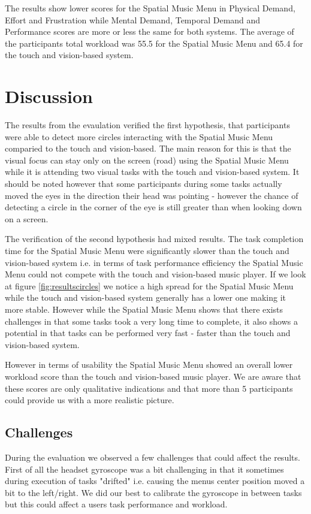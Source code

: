 The results show lower scores for the Spatial Music Menu in Physical Demand, Effort and Frustration while Mental Demand, Temporal Demand and Performance scores are more or less the same for both systems. The average of the participants total workload was 55.5 for the Spatial Music Menu and 65.4 for the touch and vision-based system.


\section{Discussion}
The results from the evaulation verified the first hypothesis, that participants were able to detect more circles interacting with the Spatial Music Menu comparied to the touch and vision-based. The main reason for this is that the visual focus can stay only on the screen (road) using the Spatial Music Menu while it is attending two visual tasks with the touch and vision-based system. It should be noted however that some participants during some tasks actually moved the eyes in the direction their head was pointing - however the chance of detecting a circle in the corner of the eye is still greater than when looking down on a screen.

The verification of the second hypothesis had mixed results. The task completion time for the Spatial Music Menu were significantly slower than the touch and vision-based system i.e. in terms of task performance efficiency the Spatial Music Menu could not compete with the touch and vision-based music player. If we look at figure \ref{fig:resultscircles} we notice a high spread for the Spatial Music Menu while the touch and vision-based system generally has a lower one making it more stable. However while the Spatial Music Menu shows that there exists challenges in that some tasks took a very long time to complete, it also shows a potential in that tasks can be performed very fast - faster than the touch and vision-based system.

However in terms of usability the Spatial Music Menu showed an overall lower workload score than the touch and vision-based music player. We are aware that these scores are only qualitative indications and that more than 5 participants could provide us with a more realistic picture.

\subsection{Challenges}
During the evaluation we observed a few challenges that could affect the results. First of all the headset gyroscope was a bit challenging in that it sometimes during execution of tasks "drifted" i.e. causing the menus center position moved a bit to the left/right. We did our best to calibrate the gyroscope in between tasks but this could affect a users task performance and workload.


